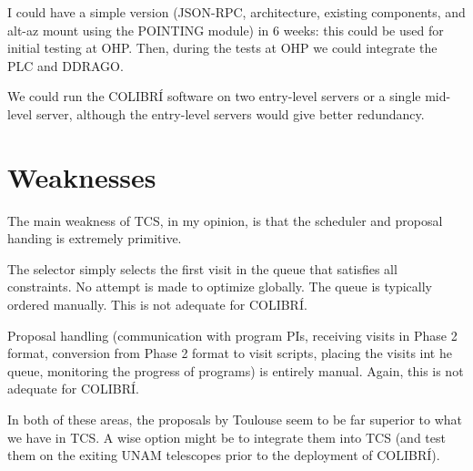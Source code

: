 \documentclass{article}
\begin{document}
I could have a simple version (JSON-RPC, architecture, existing components, and alt-az mount using the POINTING module) in 6 weeks: this could be used for initial testing at OHP. Then, during the tests at OHP we could integrate the PLC and DDRAGO.

We could run the COLIBRÍ software on two entry-level servers or a single mid-level server, although the entry-level servers would give better redundancy.

\section{Weaknesses}

The main weakness of TCS, in my opinion, is that the scheduler and proposal handing is extremely primitive.

The selector simply selects the first visit in the queue that satisfies all constraints. No attempt is made to optimize globally. The queue is typically ordered manually. This is not adequate for COLIBRÍ.

Proposal handling (communication with program PIs, receiving visits in Phase 2 format, conversion from Phase 2 format to visit scripts, placing the visits int he queue, monitoring the progress of programs) is entirely manual. Again, this is not adequate for COLIBRÍ.

In both of these areas, the proposals by Toulouse seem to be far superior to what we have in TCS. A wise option might be to integrate them into TCS (and test them  on the exiting UNAM telescopes prior to the deployment of COLIBRÍ).
\end{document}
